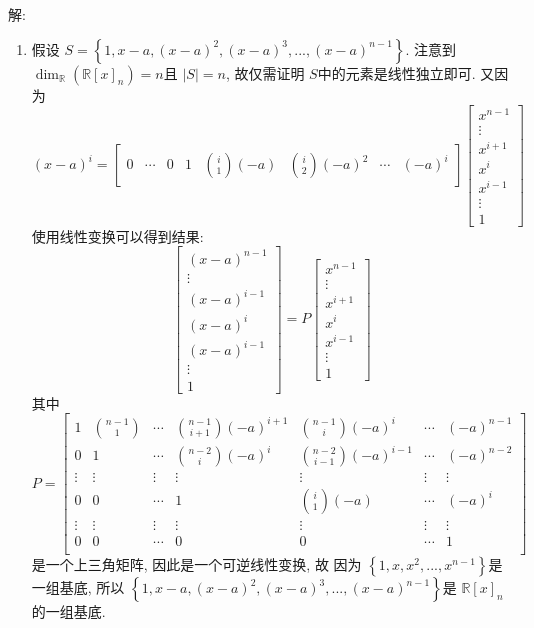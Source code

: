 \documentclass[a4paper,12pt]{ctexart}
\newcommand{\R}{\mathbb{R}}
\begin{document}
    解: \begin{enumerate}[label=(\arabic{*})]
      \item 假设 $ S=\left\{ 1,x-a,(x-a)^2,(x-a)^3,...,(x-a)^{n-1} \right\} $. 
      注意到 $ \dim_{\R}(\R[x]_n)=n $且 $ |S|=n $, 故仅需证明 $ S $中的元素是线性独立即可. 
      又因为 
      \[ (x-a)^i=\begin{bmatrix}
        0&\cdots&0&1&\binom{i}{1}(-a)&\binom{i}{2}(-a)^2&\cdots&(-a)^i
      \end{bmatrix}\begin{bmatrix}
        x^{n-1}\\\vdots\\x^{i+1}\\x^{i}\\x^{i-1}\\\vdots\\1
      \end{bmatrix} \]
      使用线性变换可以得到结果: 
      \[ \begin{bmatrix}
        (x-a)^{n-1}\\\vdots\\(x-a)^{i-1}\\(x-a)^i\\(x-a)^{i-1}\\\vdots\\1  
      \end{bmatrix}=
      P\begin{bmatrix}
        x^{n-1}\\\vdots\\x^{i+1}\\x^{i}\\x^{i-1}\\\vdots\\1
      \end{bmatrix} \]
      其中 
      \[P=\begin{bmatrix}
        1&\binom{n-1}{1}&\cdots&\binom{n-1}{i+1}(-a)^{i+1}&\binom{n-1}{i}(-a)^i&\cdots&(-a)^{n-1}\\
        0&1&\cdots&\binom{n-2}{i}(-a)^i&\binom{n-2}{i-1}(-a)^{i-1}&\cdots&(-a)^{n-2}\\
        \vdots&\vdots&\vdots&\vdots&\vdots&\vdots&\vdots\\
        0&0&\cdots&1&\binom{i}{1}(-a)&\cdots&(-a)^i\\
        \vdots&\vdots&\vdots&\vdots&\vdots&\vdots&\vdots\\
        0&0&\cdots&0&0&\cdots&1\\
      \end{bmatrix}\]是一个上三角矩阵, 因此是一个可逆线性变换, 故
      因为 $ \left\{ 1,x,x^2,...,x^{n-1} \right\} $是一组基底, 所以 $ \left\{ 1,x-a,(x-a)^2,(x-a)^3,...,(x-a)^{n-1} \right\} $是 $ \R[x]_n $的一组基底.


\end{enumerate}
\end{document}

